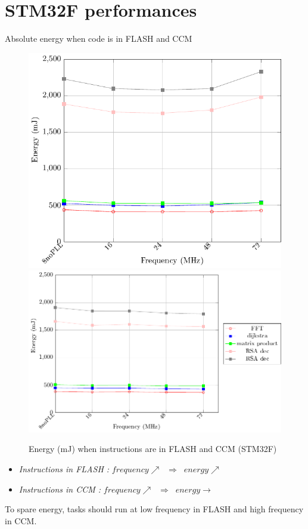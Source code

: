 \documentclass[
	11pt, %
]{beamer}
\begin{document}
\section{STM32F performances}
\begin{frame}{Absolute energy when code is in FLASH and CCM}
	\begin{figure}
		\includegraphics[scale = 0.4]{data/stm32f_v2/abs/abs_flash_energy32f.pdf}
		\includegraphics[scale = 0.4]{data/stm32f_v2/abs/abs_ccm_energy32f.pdf}
		\caption{Energy (mJ) when instructions are in FLASH and CCM (STM32F)}
	\end{figure}
	\begin{itemize}
		\item \emph{Instructions in FLASH :} $frequency \nearrow \; \; \Rightarrow \; \; energy \nearrow$
		\item \emph{Instructions in CCM : } $frequency \nearrow \; \; \Rightarrow \; \; energy \rightarrow$ 
	\end{itemize}
	To spare energy, tasks should run at low frequency in FLASH and high frequency in CCM.
\end{frame}
\end{document}
